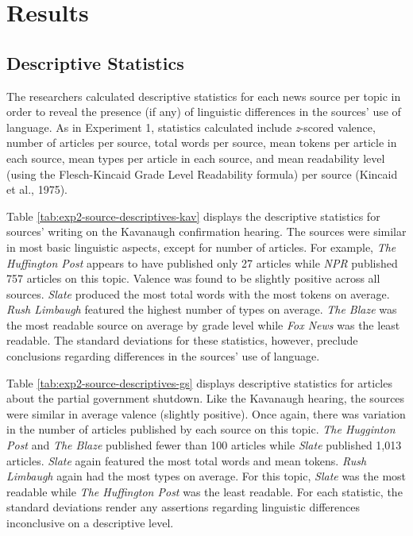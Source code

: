 \documentclass[english,,man]{apa6}
\begin{document}
\hypertarget{results-1}{%
\section{Results}\label{results-1}}

\hypertarget{descriptive-statistics-1}{%
\subsection{Descriptive Statistics}\label{descriptive-statistics-1}}

The researchers calculated descriptive statistics for each news source per topic in order to reveal the presence (if any) of linguistic differences in the sources' use of language. As in Experiment 1, statistics calculated include \emph{z}-scored valence, number of articles per source, total words per source, mean tokens per article in each source, mean types per article in each source, and mean readability level (using the Flesch-Kincaid Grade Level Readability formula) per source (Kincaid et al., 1975).

Table \ref{tab:exp2-source-descriptives-kav} displays the descriptive statistics for sources' writing on the Kavanaugh confirmation hearing. The sources were similar in most basic linguistic aspects, except for number of articles. For example, \emph{The Huffington Post} appears to have published only 27 articles while \emph{NPR} published 757 articles on this topic. Valence was found to be slightly positive across all sources. \emph{Slate} produced the most total words with the most tokens on average. \emph{Rush Limbaugh} featured the highest number of types on average. \emph{The Blaze} was the most readable source on average by grade level while \emph{Fox News} was the least readable. The standard deviations for these statistics, however, preclude conclusions regarding differences in the sources' use of language.

Table \ref{tab:exp2-source-descriptives-gs} displays descriptive statistics for articles about the partial government shutdown. Like the Kavanaugh hearing, the sources were similar in average valence (slightly positive). Once again, there was variation in the number of articles published by each source on this topic. \emph{The Hugginton Post} and \emph{The Blaze} published fewer than 100 articles while \emph{Slate} published 1,013 articles. \emph{Slate} again featured the most total words and mean tokens. \emph{Rush Limbaugh} again had the most types on average. For this topic, \emph{Slate} was the most readable while \emph{The Huffington Post} was the least readable. For each statistic, the standard deviations render any assertions regarding linguistic differences inconclusive on a descriptive level.
\end{document}
